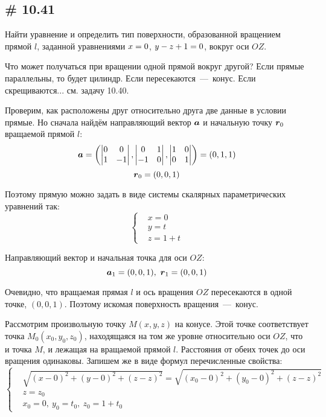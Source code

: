 \documentclass[a4paper,12pt]{article}
\begin{document}
  
  \subsection{\# 10.41}
  
  Найти уравнение и определить тип поверхности, образованной вращением прямой $l$, заданной уравнениями $x \hm= 0$, $y \hm- z \hm+ 1 \hm= 0$, вокруг оси $OZ$.
  
  \begin{solution}
    Что может получаться при вращении одной прямой вокруг другой?
    Если прямые параллельны, то будет цилиндр.
    Если пересекаются~---~конус. %
    Если скрещиваются... см. задачу 10.40.
    
    Проверим, как расположены друг относительно друга две данные в условии прямые.
    Но сначала найдём направляющий вектор $\boldsymbol a$ и начальную точку $\boldsymbol r_0$ вращаемой прямой $l$:
    \[
      \boldsymbol a = \left(\begin{vmatrix}0 & 0\\ 1 & -1\end{vmatrix}, \begin{vmatrix}0 & 1\\ -1 & 0\end{vmatrix}, \begin{vmatrix}1 & 0\\ 0 & 1\end{vmatrix}\right)
      = (0, 1, 1)
    \]
    \[
      \boldsymbol r_0 = (0, 0, 1)
    \]
    
    Поэтому прямую можно задать в виде системы скалярных параметрических уравнений так:
    \[
      \left\{
        \begin{aligned}
          &x = 0\\
          &y = t\\
          &z = 1 + t
        \end{aligned}
      \right.
    \]
    
    Направляющий вектор и начальная точка для оси $OZ$:
    \[
      \boldsymbol a_1 = (0, 0, 1),\ \boldsymbol r_1 = (0, 0, 1)
    \]
    
    Очевидно, что вращаемая прямая $l$ и ось вращения $OZ$ пересекаются в одной точке, $(0, 0, 1)$.
    Поэтому искомая поверхность вращения~---~конус.
    
    Рассмотрим произвольную точку $M(x, y, z)$ на конусе.
    Этой точке соответствует точка $M_0(x_0, y_0, z_0)$, находящаяся на том же уровне относительно оси $OZ$, что и точка $M$, и лежащая на вращаемой прямой $l$.
    Расстояния от обеих точек до оси вращения одинаковы.
    Запишем же в виде формул перечисленные свойства:
    \[
      \left\{
        \begin{aligned}
          &\sqrt{(x - 0)^2 + (y - 0)^2 + (z - z)^2} = \sqrt{(x_0 - 0)^2 + (y_0 - 0)^2 + (z - z)^2}\\
          &z = z_0\\
          &x_0 = 0,\ y_0 = t_0,\ z_0 = 1 + t_0
        \end{aligned}
      \right.
    \]
    

\end{solution}
\end{document}

